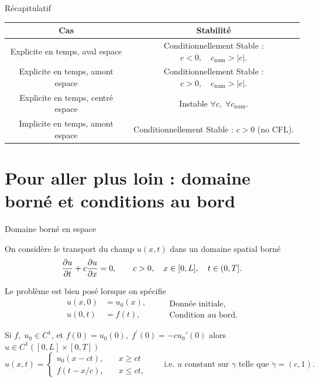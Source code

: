 \documentclass[aspectratio=169, french]{beamer}
\begin{document}
\begin{frame}{Récapitulatif}
\begin{tabular}{c|c}
	\hline
Cas	&  Stabilité \\
	\hline
Explicite en temps, aval espace	& Conditionnellement Stable : $c<0, \quad c_{\text{num}} > |c|$.   \\
Explicite en temps, amont espace & Conditionnellement Stable : $c>0, \quad c_{\text{num}} > |c|$.  \\
Explicite en temps, centré espace &  Instable $\forall c, \; \forall c_{\text{num}}$. \\
Implicite en temps, amont espace & Conditionnellement Stable : $c>0$ (no CFL). \\
	\hline
\end{tabular}
\end{frame}

\section{Pour aller plus loin : domaine borné et conditions au bord}

\begin{frame}{Domaine borné en espace}
	
On considère le transport du champ $u(x, t)$ dans un domaine spatial borné
\begin{equation*}
	\diffp{u}{t} + c \diffp{u}{x} = 0, \qquad c > 0, \quad  x \in [0, L], \quad t \in (0, T]. 
\end{equation*}
		
		Le problème est bien posé lorsque on spécifie 
		\begin{equation*}
			\begin{aligned}
			u(x, 0) &= u_0(x),\\
			u(0, t) &= f(t),
			\end{aligned} \qquad
			\begin{aligned}
			\text{Donnée initiale}, \\
			\text{Condition au bord}.
			\end{aligned}
		\end{equation*}
	\begin{tcolorbox}[title = Solution analytique, coltitle=white]
Si $f, \; u_0 \in C^{1}$, et $f(0) = u_0(0), \; f^{'}(0) = -c u_0{'}(0)$
alors  $u \in C^{1}([0, L]\times [0, T])$ 
\begin{equation*}
	u(x, t) = \begin{cases}
		u_0(x - ct), \quad &x\ge ct\\
		f(t-x/c), \quad &x\le ct,
	\end{cases}
	\qquad\text{i.e. $u$ constant sur $\gamma$ telle que $\dot{\gamma} = (c ,1)$.}
\end{equation*}
\end{tcolorbox}
	
\end{frame}
\end{document}
